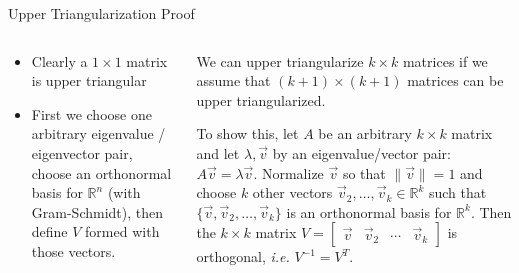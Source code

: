 \begin{frame}{Upper Triangularization Proof}

\begin{columns}[T] %
\begin{column}{.38\textwidth}
%
    \begin{itemize}
        \item Clearly a \(1 \times 1\) matrix is upper triangular
        \item
            First we choose one arbitrary eigenvalue / eigenvector pair, choose an orthonormal basis for \(\mathbb R^n\) (with Gram-Schmidt), then define \(V\) formed with those vectors.
    \end{itemize}

\end{column}%
\hfill%
\begin{column}{.66\textwidth}
    We can upper triangularize \(k \times k\) matrices if we assume that \((k+1) \times (k+1)\) matrices can be upper triangularized.

    To show this, let \(A\) be an arbitrary \(k \times k\) matrix and let \(\lambda, \vec v\) by an eigenvalue/vector pair: \(A \vec v = \lambda \vec v\).
    Normalize \(\vec v\) so that \(\lVert \vec v \rVert = 1\) and choose \(k\) other vectors \(\vec v_2, \ldots, \vec v_k \in \mathbb R^{k}\) such that \(\{\vec v, \vec v_2, \ldots, \vec v_k\}\) is an orthonormal basis for \(\mathbb R^{k}\). Then the \(k \times k\) matrix \(V = \begin{bmatrix} \vec v & \vec v_2 & \cdots  &\vec v_k \end{bmatrix}\) is orthogonal, \emph{i.e.}
        \( V^{-1} = V^T
        \).



\end{column}%
\end{columns}


\end{frame}

